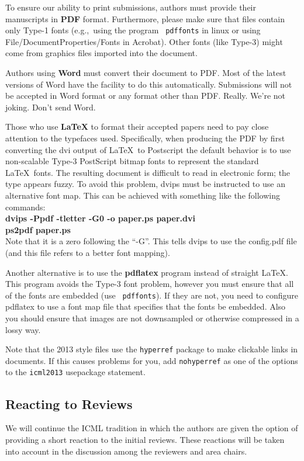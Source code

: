 \documentclass{article}
\begin{document}
\medskip

To ensure our ability to print submissions, authors must provide their
manuscripts in \textbf{PDF} format.  Furthermore, please make sure
that files contain only Type-1 fonts (e.g.,~using the program {\tt
  pdffonts} in linux or using File/DocumentProperties/Fonts in
Acrobat).  Other fonts (like Type-3) might come from graphics files
imported into the document.

Authors using \textbf{Word} must convert their document to PDF.  Most
of the latest versions of Word have the facility to do this
automatically.  Submissions will not be accepted in Word format or any
format other than PDF. Really. We're not joking. Don't send Word.

Those who use \textbf{\LaTeX} to format their accepted papers need to
pay close attention to the typefaces used.  Specifically, when
producing the PDF by first converting the dvi output of \LaTeX\ to Postscript
the default behavior is to use non-scalable Type-3 PostScript bitmap
fonts to represent the standard \LaTeX\ fonts. The resulting document
is difficult to read in electronic form; the type appears fuzzy. To
avoid this problem, dvips must be instructed to use an alternative
font map.  This can be achieved with
something like the following commands:\\[0.5em]
{\bf dvips -Ppdf -tletter -G0 -o paper.ps paper.dvi}\\
{\bf ps2pdf paper.ps}\\[0.5em]
Note that it is a zero following the ``-G''.  This tells dvips to use
the config.pdf file (and this file refers to a better font mapping).

Another alternative is to use the \textbf{pdflatex} program instead of
straight \LaTeX. This program avoids the Type-3 font problem, however
you must ensure that all of the fonts are embedded (use {\tt
pdffonts}). If they are not, you need to configure pdflatex to use a
font map file that specifies that the fonts be embedded. Also you
should ensure that images are not downsampled or otherwise compressed
in a lossy way.

Note that the 2013 style files use the {\tt hyperref} package to
make clickable links in documents.  If this causes problems for you,
add {\tt nohyperref} as one of the options to the {\tt icml2013}
usepackage statement.

\subsection{Reacting to Reviews}
We will continue the ICML tradition in which the authors are given the
option of providing a short reaction to the initial reviews. These
reactions will be taken into account in the discussion among the
reviewers and area chairs.
\end{document}
